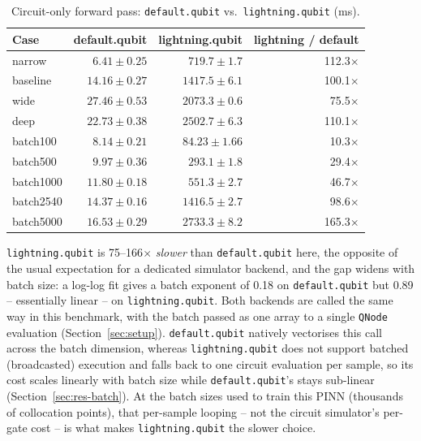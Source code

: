 \begin{table}[h]
\centering
\caption{Circuit-only forward pass: \texttt{default.qubit} vs.\ \texttt{lightning.qubit} (ms).}
\label{tab:backend}
\small
\begin{tabular}{@{}lrrr@{}}
\toprule
Case & default.qubit & lightning.qubit & lightning / default \\
\midrule
narrow    & $6.41\pm0.25$  & $719.7\pm1.7$   & 112.3$\times$ \\
baseline  & $14.16\pm0.27$ & $1417.5\pm6.1$  & 100.1$\times$ \\
wide      & $27.46\pm0.53$ & $2073.3\pm0.6$  & 75.5$\times$ \\
deep      & $22.73\pm0.38$ & $2502.7\pm6.3$  & 110.1$\times$ \\
\addlinespace
batch100  & $8.14\pm0.21$  & $84.23\pm1.66$  & 10.3$\times$ \\
batch500  & $9.97\pm0.36$  & $293.1\pm1.8$   & 29.4$\times$ \\
batch1000 & $11.80\pm0.18$ & $551.3\pm2.7$   & 46.7$\times$ \\
batch2540 & $14.37\pm0.16$ & $1416.5\pm2.7$  & 98.6$\times$ \\
batch5000 & $16.53\pm0.29$ & $2733.3\pm8.2$  & 165.3$\times$ \\
\bottomrule
\end{tabular}
\end{table}

\texttt{lightning.qubit} is 75--166$\times$ \emph{slower} than \texttt{default.qubit} here, the opposite of
the usual expectation for a dedicated simulator backend, and the gap widens with batch size: a log-log fit
gives a batch exponent of 0.18 on \texttt{default.qubit} but 0.89 -- essentially linear -- on
\texttt{lightning.qubit}. Both backends are called the same way in this benchmark, with the batch passed as
one array to a single \texttt{QNode} evaluation (Section~\ref{sec:setup}). \texttt{default.qubit} natively
vectorises this call across the batch dimension, whereas \texttt{lightning.qubit} does not support batched
(broadcasted) execution and falls back to one circuit evaluation per sample, so its cost scales linearly
with batch size while \texttt{default.qubit}'s stays sub-linear (Section~\ref{sec:res-batch}). At the batch
sizes used to train this PINN (thousands of collocation points), that per-sample looping -- not the circuit
simulator's per-gate cost -- is what makes \texttt{lightning.qubit} the slower choice.
